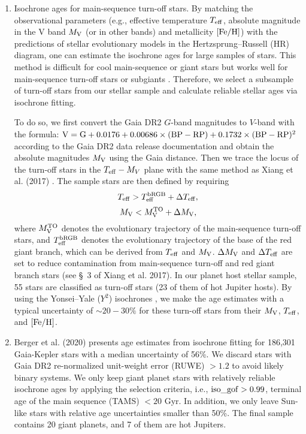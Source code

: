 \documentclass[twocolumn]{pnas-new}
\begin{document}
\begin{enumerate}

\item Isochrone ages for main-sequence turn-off stars.
By matching the observational parameters (e.g., effective temperature $T_{\rm eff}$, absolute magnitude in the V band $M_{\rm V}$ (or in other bands) and
metallicity $\rm [Fe/H]$) with the predictions of stellar evolutionary models in the Hertzsprung–Russell (HR) diagram, one can estimate the isochrone ages for large samples of stars.
This method is difficult for cool main-sequence or giant stars but works well for main-sequence turn-off stars or subgiants \citep[e.g.,][]{2010ARA&A..48..581S}.
Therefore, we select a subsample of turn-off stars from our stellar sample and calculate reliable stellar ages via isochrone fitting.

To do so, we first convert the Gaia DR2 $G$-band magnitudes to $V$-band with the formula: $\rm V = G+0.0176 +0.00686 \times (BP-RP)+0.1732 \times (BP-RP)^2$ according to the Gaia DR2 data release documentation \citep{2018A&A...616A...1G} and obtain the absolute magnitudes $M_{\rm V}$ using the Gaia distance.
Then we trace the locus of the turn-off stars in the $T_{\rm eff}-M_{V}$ plane with the same method as Xiang et al. (2017) \citep{2017ApJS..232....2X}.
The sample stars are then defined by requiring
\begin{equation}
  T_{\rm eff}>T^{\rm bRGB}_{\rm eff}+\Delta T_{\rm eff},
\end{equation}
\begin{equation}
  M_{\rm V}<M^{\rm TO}_{\rm V}+\Delta M_{\rm V},
\end{equation}
where $M_{\rm V}^{\rm TO}$ denotes the evolutionary trajectory of the main-sequence turn-off stars,
and $T^{\rm bRGB}_{\rm eff}$ denotes the evolutionary trajectory of the base of the red giant branch, which can be derived from $T_{\rm eff}$ and $M_{\rm V}$.
$\Delta M_{\rm V}$ and $\Delta T_{\rm eff}$ are set to reduce contamination from main-sequence turn-off and red giant branch stars (see \S~3 of Xiang et al. 2017).
In our planet host stellar sample, 55 stars are classified as turn-off stars (23 of them of hot Jupiter hosts).
By using the Yonsei–Yale ($Y^2$) isochrones \citep{2004ApJS..155..667D}, we make the age estimates with a typical uncertainty of $\sim 20-30\%$ for these turn-off stars from their $M_{\rm V}$, $T_{\rm eff}$, and $\rm [Fe/H]$.

\item Berger et al. (2020) \cite{2020AJ....159..280B} presents age estimates from isochrone fitting for 186,301 Gaia-Kepler stars with a median uncertainty of 56\%. 
We discard stars with Gaia DR2 re-normalized unit-weight error (RUWE) $>1.2$ to avoid likely binary systems. 
We only keep giant planet stars with relatively reliable isochrone ages
by applying the selection criteria, i.e., $\rm iso\_gof>0.99$, terminal age of the main sequence (TAMS) $<20$ Gyr.
In addition, we only leave Sun-like stars with relative age uncertainties smaller than 50\%. 
The final sample contains 20 giant planets, and 7 of them are hot Jupiters.


\end{enumerate}
\end{document}
